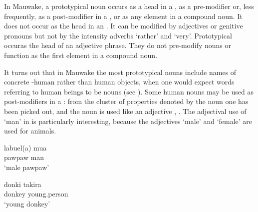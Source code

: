 In Mauwake, a prototypical noun occurs as a head in a , as a pre-modifier or, less frequently, as a post-modifier in a , or as any element in a compound noun. It does not occur as the head in an . It can be modified by adjectives or genitive pronouns but not by the intensity adverbs  `rather' and  `very'. Prototypical \textstyleEmphasizedWords{ }occur\textstyleEmphasizedWords{ }as the head of an adjective phrase. They do not pre-modify nouns or function as the first element in a compound noun.

It turns out that in Mauwake the most prototypical nouns include names of concrete -human rather than human objects, when one would expect words referring to human beings to be nouns  (see \citealt[192]{Taylor1989}). Some human nouns may be used as post-modifiers in a : from the cluster of properties denoted by the noun one has been picked out, and the noun is used like an adjective , . The adjectival use of  `man' in  is particularly interesting, because the adjectives  `male' and  `female' are used for animals.

\ea%
\label{ex:3:x23}
\gll labuel(a) mua \\
pawpaw man\\
\glt`male pawpaw'
\z

\ea%
\label{ex:3:x24}
\gll donki takira \\
donkey young.person\\
\glt`young donkey'
\z

